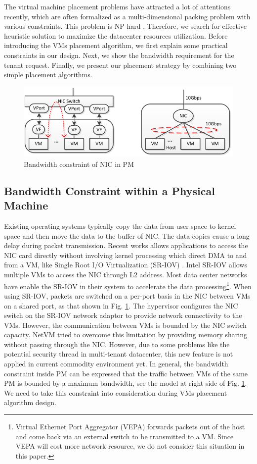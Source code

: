 \documentclass[review]{elsarticle}
\begin{document}
The virtual machine placement problems have attracted a lot of attentions recently, which are often formalized as a multi-dimensional packing problem with various constraints. This problem is NP-hard \cite{packing, fischer2013virtual}. %
Therefore, we search for effective heuristic solution to maximize the datacenter resources utilization. Before introducing the VMs placement algorithm, we first explain some practical constraints in our design. Next, we show the bandwidth requirement for the tenant request. Finally, we present our placement strategy by combining two simple placement algorithms. 

\begin{figure}
	\centering
		\includegraphics[width=3.5 in]{fig/nic.pdf}
	\caption{Bandwidth constraint of NIC in PM}
	\label{fig:nic}
\end{figure}

\subsection{Bandwidth Constraint within a Physical Machine}

Existing operating systems typically copy the data from user space to kernel space and then move the data to the buffer of NIC. The data copies cause a long delay during packet transmission. Recent works allows applications to access the NIC card directly without involving kernel processing which direct DMA to and from a VM, like Single Root I/O Virtualization (SR-IOV) \cite{sriov}. Intel SR-IOV allows multiple VMs to access the NIC through L2 address. Most data center networks have enable the SR-IOV in their system to accelerate the data processing\footnote{Virtual Ethernet Port Aggregator (VEPA) forwards packets out of the host and come back via an external switch to be transmitted to a VM. Since VEPA will cost more network resource, we do not consider this situation in this paper.}. When using SR-IOV, packets are switched on a per-port basis in the NIC between VMs on a shared port, as that shown in Fig. \ref{fig:nic}. The hypervisor configures the NIC switch on the SR-IOV network adaptor to provide network connectivity to the VMs. However, the communication between VMs is bounded by the NIC switch capacity. NetVM \cite{netvm} tried to overcome this limitation by providing  memory sharing without passing through the NIC. However, due to some problems like the potential security thread in multi-tenant datacenter, this new feature is not applied in current commodity environment yet. In general, the bandwidth constraint inside PM can be expressed that the traffic between VMs of the same PM is bounded by a maximum bandwidth, see the model at right side of Fig. \ref{fig:nic}. We need to take this constraint into consideration during VMs placement algorithm design.
\end{document}
